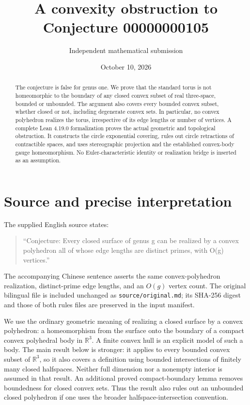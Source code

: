 \documentclass[11pt]{article}
\title{A convexity obstruction to Conjecture 00000000105}
\author{Independent mathematical submission}
\date{October 10, 2026}
\newcommand{\R}{\mathbb R}
\newcommand{\code}[1]{\texttt{\small #1}}
\begin{document}
\maketitle
\begin{abstract}
The conjecture is false for genus one. We prove that the standard torus is not homeomorphic to the boundary of any closed convex subset of real three-space, bounded or unbounded. The argument also covers every bounded convex subset, whether closed or not, including degenerate convex sets. In particular, no convex polyhedron realizes the torus, irrespective of its edge lengths or number of vertices. A complete Lean 4.19.0 formalization proves the actual geometric and topological obstruction. It constructs the circle exponential covering, rules out circle retractions of contractible spaces, and uses stereographic projection and the established convex-body gauge homeomorphism. No Euler-characteristic identity or realization bridge is inserted as an assumption.
\end{abstract}

\section{Source and precise interpretation}
The supplied English source states:
\begin{quote}
``Conjecture: Every closed surface of genus g can be realized by a convex polyhedron all of whose edge lengths are distinct primes, with O(g) vertices.''
\end{quote}
The accompanying Chinese sentence asserts the same convex-polyhedron realization, distinct-prime edge lengths, and an $O(g)$ vertex count. The original bilingual file is included unchanged as \code{source/original.md}; its SHA-256 digest and those of both rules files are preserved in the input manifest.

We use the ordinary geometric meaning of realizing a closed surface by a convex polyhedron: a homeomorphism from the surface onto the boundary of a compact convex polyhedral body in $\R^3$. A finite convex hull is an explicit model of such a body. The main result below is stronger: it applies to every bounded convex subset of $\R^3$, so it also covers a definition using bounded intersections of finitely many closed halfspaces. Neither full dimension nor a nonempty interior is assumed in that result. An additional proved compact-boundary lemma removes boundedness for closed convex sets. Thus the result also rules out an unbounded closed polyhedron if one uses the broader halfspace-intersection convention.
\end{document}
